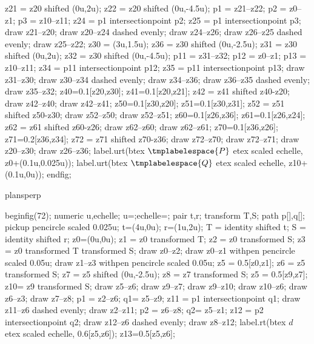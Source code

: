 {{{\begin{mplibcode}[PfLAP]
				z21 = z20 shifted (0u,2u);
				z22 = z20 shifted (0u,-4.5u);
				p1 = z21--z22;
				p2 = z0--z1;
				p3 = z10--z11;
				z24 = p1 intersectionpoint p2;
				z25 = p1 intersectionpoint p3;
				draw z21--z20;
				draw z20--z24 dashed evenly;
				draw z24--z26;
				draw z26--z25 dashed evenly;
				draw z25--z22;
				z30 = (3u,1.5u);
				z36 = z30 shifted (0u,-2.5u);
				z31 = z30 shifted (0u,2u);
				z32 = z30 shifted (0u,-4.5u);
				p11 = z31--z32;
				p12 = z0--z1;
				p13 = z10--z11;
				z34 = p11 intersectionpoint p12;
				z35 = p11 intersectionpoint p13;
				draw z31--z30;
				draw z30--z34 dashed evenly;
				draw z34--z36;
				draw z36--z35 dashed evenly;
				draw z35--z32;
				z40=0.1[z20,z30];
				z41=0.1[z20,z21];
				z42 = z41 shifted z40-z20;
				draw z42--z40;
				draw z42--z41;
				z50=0.1[z30,z20];
				z51=0.1[z30,z31];
				z52 = z51 shifted z50-z30;
				draw z52--z50;
				draw z52--z51;
				z60=0.1[z26,z36];
				z61=0.1[z26,z24];
				z62 = z61 shifted z60-z26;
				draw z62--z60;
				draw z62--z61;
				z70=0.1[z36,z26];
				z71=0.2[z36,z34];
				z72 = z71 shifted z70-z36;
				draw z72--z70;
				draw z72--z71;
				draw z20--z30;
				draw z26--z36;
				label.urt(btex $\tmplabelespace{P}$ etex scaled echelle, z0+(0.1u,0.025u));
				label.urt(btex $\tmplabelespace{Q}$ etex scaled echelle, z10+(0.1u,0u));
				endfig;
			\end{mplibcode}
		}%
		{plansperp}{%
			\begin{mplibcode}[PfLAQ]
				beginfig(72);
				numeric u,echelle;
				u=\scaleminischemspace*1cm;echelle=\scaleminischemspace;
				pair t,r;
				transform T,S;
				path p[],q[];
				pickup pencircle scaled 0.025u;
				t=(4u,0u); r=(1u,2u);
				T = identity shifted t;
				S = identity shifted r;
				z0=(0u,0u);
				z1 = z0 transformed T;
				z2 = z0 transformed S;
				z3 = z0 transformed T transformed S;
				draw z0--z2;
				draw z0--z1 withpen pencircle scaled 0.05u;
				draw z1--z3 withpen pencircle scaled 0.05u;
				z5 = 0.5[z0,z1];
				z6 = z5 transformed S;
				z7 = z5 shifted (0u,-2.5u);
				z8 = z7 transformed S;
				z5 = 0.5[z9,z7];
				z10= z9 transformed S;
				draw z5--z6; 
				draw z9--z7;
				draw z9--z10;
				draw z10--z6;
				draw z6--z3;
				draw z7--z8;
				p1 = z2--z6;
				q1= z5--z9;
				z11 = p1 intersectionpoint q1;
				draw z11--z6 dashed evenly;
				draw z2--z11;
				p2 = z6--z8;
				q2= z5--z1;
				z12 = p2 intersectionpoint q2;
				draw z12--z6 dashed evenly;
				draw z8--z12;
				label.rt(btex $d$ etex scaled echelle, 0.6[z5,z6]);
				z13=0.5[z5,z6];

\end{mplibcode}}}}
